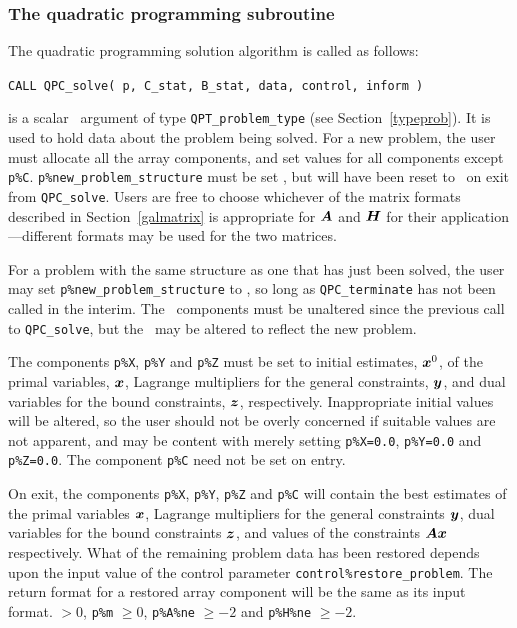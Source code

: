 \documentclass{galahad}
\newcommand{\packagename}{QPC}
\begin{document}

\subsubsection{The quadratic programming subroutine}\label{qps}
The quadratic programming solution algorithm is called as follows:
\vspace*{1mm}

\hspace{8mm}
{\tt CALL \packagename\_solve( p, C\_stat, B\_stat, data, control, inform )}

\vspace*{-3mm}
\begin{description}
 is a scalar \intentinout\ argument of type 
{\tt QPT\_problem\_type}
(see Section~\ref{typeprob}). 
It is used to hold data about the problem being solved.
For a new problem, the user must allocate all the array components,
and set values for all components except {\tt p\%C}.
{\tt p\%new\_problem\_structure} must be set \true, but will have been reset
to \false\ on exit from {\tt \packagename\_solve}.
Users are free to choose whichever
of the matrix formats described in Section~\ref{galmatrix} 
is appropriate for ${\bm{A}}$ and ${\bm{H}}$ for their application---different 
formats may be used for the two matrices.

For a problem with the same structure as one that has just been 
solved, the user may set {\tt p\%new\_problem\-\_str\-u\-cture} to \false,
so long as {\tt \packagename\_terminate} has not been called in the interim.
The \integer\ components must be unaltered since the
previous call to {\tt \packagename\_solve}, but the \realdp\ 
may be altered to reflect the new problem.

The components {\tt p\%X}, {\tt p\%Y} and {\tt p\%Z}
must be set to initial estimates, ${\bm{x}}^{0}$, of the primal variables, 
${\bm{x}}$, Lagrange multipliers for the general constraints, ${\bm{y}}$, 
and dual variables for the bound constraints, ${\bm{z}}$, respectively.
Inappropriate initial values will be altered, so the user should
not be overly concerned if suitable values are not apparent, and may be
content with merely setting {\tt p\%X=0.0},
{\tt p\%Y=0.0} and {\tt p\%Z=0.0}.
The component {\tt p\%C} need not be set on entry.

On exit, the components {\tt p\%X}, {\tt p\%Y}, {\tt p\%Z} and {\tt p\%C}
will contain the best estimates of the primal variables ${\bm{x}}$, 
Lagrange multipliers for the general
constraints ${\bm{y}}$, dual variables for the bound constraints ${\bm{z}}$, 
and values of the constraints ${\bm{A}} {\bm{x}}$ respectively.
What of the remaining problem data has been restored depends upon
the input value of the control parameter {\tt control\%restore\_problem}.
The return format for a restored array component will be the same as its
input format.
 $> 0$, {\tt p\%m} $\geq 0$,
              {\tt p\%A\%ne} $\geq -2$ and {\tt p\%H\%ne} $\geq -2$.


\end{description}
\end{document}
